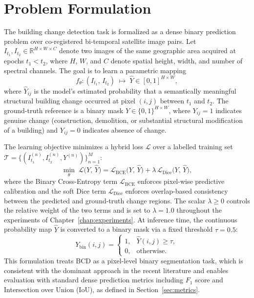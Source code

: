 \section{Problem Formulation}
\label{sec:problem-notation}

The building change detection task is formalized as a dense binary prediction
problem over co-registered bi-temporal satellite image pairs. Let
$I_{t_1}, I_{t_2} \in \mathbb{R}^{H \times W \times C}$ denote two images of
the same geographic area acquired at epochs $t_1 < t_2$, where $H$, $W$, and
$C$ denote spatial height, width, and number of spectral channels. The goal
is to learn a parametric mapping
\begin{equation}
f_\theta : (I_{t_1},\, I_{t_2}) \;\longmapsto\; \hat{Y} \in [0,1]^{H \times W},
\label{eq:problem_mapping}
\end{equation}
where $\hat{Y}_{ij}$ is the model's estimated probability that a semantically
meaningful structural building change occurred at pixel $(i,j)$ between $t_1$
and $t_2$. The ground-truth reference is a binary mask
$Y \in \{0,1\}^{H \times W}$, where $Y_{ij}=1$ indicates genuine change
(construction, demolition, or substantial structural modification of a building)
and $Y_{ij}=0$ indicates absence of change.

The learning objective minimizes a hybrid loss $\mathcal{L}$ over a labelled
training set $\mathcal{T} = \{(I_{t_1}^{(n)}, I_{t_2}^{(n)}, Y^{(n)})\}_{n=1}^{M}$:
\begin{equation}
\min_{\theta}\;\mathcal{L}\bigl(Y,\,\hat{Y}\bigr)
    = \mathcal{L}_{\mathrm{BCE}}\bigl(Y,\,\hat{Y}\bigr)
    + \lambda\,\mathcal{L}_{\mathrm{Dice}}\bigl(Y,\,\hat{Y}\bigr),
\label{eq:training_objective}
\end{equation}
where the Binary Cross-Entropy term $\mathcal{L}_{\mathrm{BCE}}$ enforces
pixel-wise predictive calibration and the soft Dice term
$\mathcal{L}_{\mathrm{Dice}}$ enforces overlap-based consistency between
the predicted and ground-truth change regions. The scalar $\lambda \geq 0$
controls the relative weight of the two terms and is set to $\lambda = 1.0$
throughout the experiments of Chapter~\ref{chap:experiments}. At inference
time, the continuous probability map $\hat{Y}$ is converted to a binary mask
via a fixed threshold $\tau = 0.5$:
\begin{equation}
Y_{\mathrm{bin}}(i,j) =
\begin{cases}
1, & \hat{Y}(i,j) \geq \tau, \\
0, & \text{otherwise.}
\end{cases}
\label{eq:threshold}
\end{equation}
This formulation treats BCD as a pixel-level binary segmentation task, which
is consistent with the dominant approach in the recent literature
\cite{Bandara2022ChangeFormer, Fang2021SNUNetCD, Zhang2020FusionNetDSIFN}
and enables evaluation with standard dense prediction metrics including $F_1$
score and Intersection over Union (IoU), as defined in
Section~\ref{sec:metrics}.


